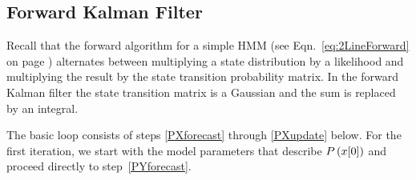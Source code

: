 \subsection{Forward Kalman Filter}
\label{sec:DetailForward}

Recall that the forward algorithm for a simple HMM (see
Eqn.~\eqref{eq:2LineForward} on page \pageref{eq:2LineForward})
alternates between multiplying a state distribution by a likelihood
and multiplying the result by the state transition probability matrix.
In the forward Kalman filter the state transition matrix is a Gaussian
and the sum is replaced by an integral.

The basic loop consists of steps \ref{PXforecast} through
\ref{PXupdate} below.  For the first iteration, we start with the
model parameters that describe $P\left({x}{[0]} \right)$ and proceed
directly to step~\ref{PYforecast}.
